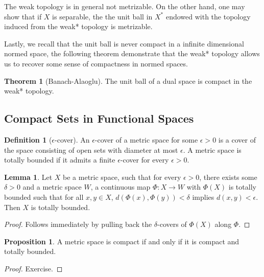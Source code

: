\documentclass[]{article}
\theoremstyle{definition}
\newtheorem{theorem}{Theorem}
\theoremstyle{definition}
\newtheorem{definition}{Definition}[section]
\newtheorem{lemma}{Lemma}[section]
\newtheorem{proposition}{Proposition}[section]
\begin{document}
The weak topology is in general not metrizable. On the other hand, one 
may show that if \(X\) is separable, the the unit ball in \(X^*\) endowed 
with the topology induced from the weak* topology is metrizable.

Lastly, we recall that the unit ball is never compact in a infinite dimensional 
normed space, the following theorem demonstrate that the weak* topology allows 
us to recover some sense of compactness in normed spaces.

\begin{theorem}[Banach-Alaoglu]
  The unit ball of a dual space is compact in the weak* topology.
\end{theorem}

\subsection{Compact Sets in Functional Spaces}

\begin{definition}[\(\epsilon\)-cover]
  An \(\epsilon\)-cover of a metric space for some \(\epsilon > 0\) is a cover 
  of the space consisting of open sets with diameter at most \(\epsilon\). 
  A metric space is totally bounded if it admits a finite \(\epsilon\)-cover 
  for every \(\epsilon > 0\).
\end{definition}

\begin{lemma}\label{tb}
  Let \(X\) be a metric space, such that for every \(\epsilon > 0\), there 
  exists some \(\delta > 0\) and a metric space \(W\), a continuous map 
  \(\Phi : X \to W\) with \(\Phi(X)\) is totally bounded such that for all 
  \(x, y \in X\), \(d(\Phi(x), \Phi(y)) < \delta\) implies 
  \(d(x, y) < \epsilon\). Then \(X\) is totally bounded. 
\end{lemma}
\begin{proof}
  Follows immediately by pulling back the \(\delta\)-covers of \(\Phi(X)\) along 
  \(\Phi\). 
\end{proof}

\begin{proposition}
  A metric space is compact if and only if it is compact and totally bounded.
\end{proposition}
\begin{proof}
  Exercise.
\end{proof}
\end{document}
